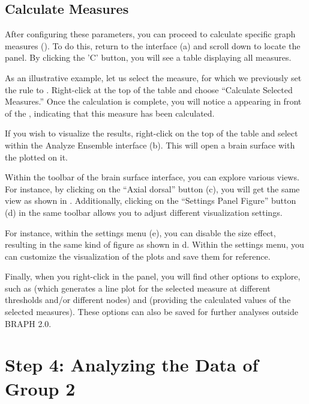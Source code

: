 \documentclass[justified]{tufte-handout}
\begin{document}
\subsection{Calculate Measures}
 
After configuring these parameters, you can proceed to calculate specific graph measures (). To do this, return to the  interface (a) and scroll down to locate the  panel. By clicking the 'C' button, you will see a table displaying all measures.

As an illustrative example, let us select the  measure, for which we previously set the rule to . Right-click at the top of the table and choose “Calculate Selected Measures.” Once the calculation is complete, you will notice a  appearing in front of the , indicating that this measure has been calculated.

If you wish to visualize the results, right-click on the top of the table and select  within the Analyze Ensemble interface (b). This will open a brain surface with the  plotted on it.

Within the toolbar of the brain surface interface, you can explore various views.
For instance, by clicking on the “Axial dorsal” button (c), you will get the same view as shown in . Additionally, clicking on the “Settings Panel Figure” button (d) in the same toolbar allows you to adjust different visualization settings.

For instance, within the settings menu (e), you can disable the size effect, resulting in the same kind of figure as shown in d. Within the settings menu, you can customize the visualization of the plots and save them for reference.

Finally, when you right-click in the  panel, you will find other options to explore, such as  (which generates a line plot for the selected measure at different thresholds and/or different nodes) and  (providing the calculated values of the selected measures). These options can also be saved for further analyses outside BRAPH 2.0.

\section{Step 4: Analyzing the Data of Group 2}
\end{document}
